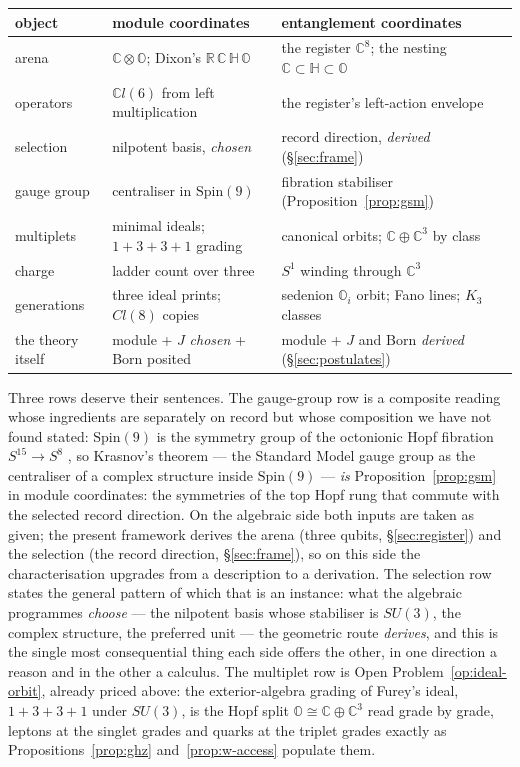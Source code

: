 \begin{center}
\begin{tabular}{lll}
\hline
object & module coordinates & entanglement coordinates \\
\hline
arena & $\mathbb{C}\otimes\mathbb{O}$; Dixon's $\mathbb{R\,C\,H\,O}$ &
  the register $\mathbb{C}^8$; the nesting $\mathbb{C}\subset\mathbb{H}\subset\mathbb{O}$ \\
operators & $\mathbb{C}l(6)$ from left multiplication &
  the register's left-action envelope \\
selection & nilpotent basis, \emph{chosen} &
  record direction, \emph{derived} (\S\ref{sec:frame}) \\
gauge group & centraliser in $\mathrm{Spin}(9)$ &
  fibration stabiliser (Proposition~\ref{prop:gsm}) \\
multiplets & minimal ideals; $1{+}3{+}3{+}1$ grading &
  canonical orbits; $\mathbb{C}\oplus\mathbb{C}^3$ by class \\
charge & ladder count over three &
  $S^1$ winding through $\mathbb{C}^3$ \\
generations & three ideal prints; $Cl(8)$ copies &
  sedenion $\mathbb{O}_i$ orbit; Fano lines; $K_3$ classes \\
the theory itself & module + $J$ \emph{chosen} + Born posited &
  module + $J$ and Born \emph{derived} (\S\ref{sec:postulates}) \\
\hline
\end{tabular}
\end{center}

Three rows deserve their sentences. The gauge-group row is a composite reading whose ingredients
are separately on record but whose composition we have not found stated: $\mathrm{Spin}(9)$ is
the symmetry group of the octonionic Hopf fibration $S^{15} \to S^8$
\autocite{partonpiccinni2018spin9}, so Krasnov's theorem --- the Standard Model gauge group as the centraliser of a
complex structure inside $\mathrm{Spin}(9)$ --- \emph{is} Proposition~\ref{prop:gsm} in module
coordinates: the symmetries of the top Hopf rung that commute with the selected record direction.
On the algebraic side both inputs are taken as given; the present framework derives the arena
(three qubits, \S\ref{sec:register}) and the selection (the record direction, \S\ref{sec:frame}),
so on this side the characterisation upgrades from a description to a derivation. The selection
row states the general pattern of which that is an instance: what the algebraic programmes
\emph{choose} --- the nilpotent basis whose stabiliser is $SU(3)$, the complex structure, the
preferred unit --- the geometric route \emph{derives}, and this is the single most consequential
thing each side offers the other, in one direction a reason and in the other a calculus. The
multiplet row is Open Problem~\ref{op:ideal-orbit}, already priced above: the exterior-algebra
grading of Furey's ideal, $1{+}3{+}3{+}1$ under $SU(3)$, is the Hopf split
$\mathbb{O} \cong \mathbb{C}\oplus\mathbb{C}^3$ read grade by grade, leptons at the singlet
grades and quarks at the triplet grades exactly as Propositions~\ref{prop:ghz}
and~\ref{prop:w-access} populate them.

